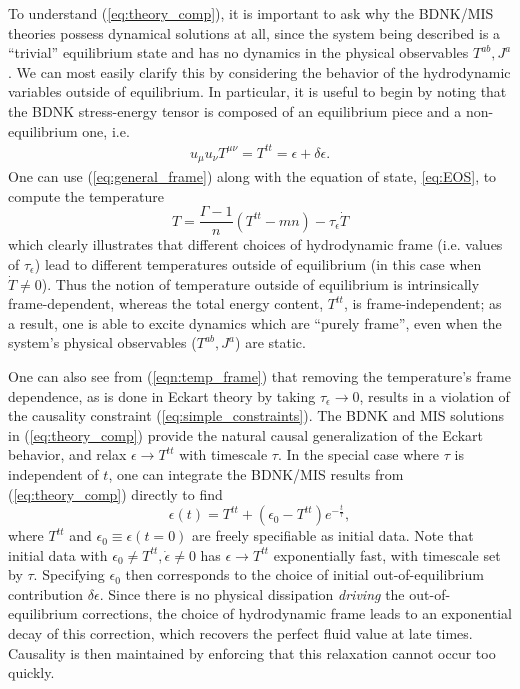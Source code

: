 \documentclass[%
notitlepage,
superscriptaddress,
nofootinbib,
amsmath,
amssymb,
aps,
twocolumn
]{revtex4-1}
\begin{document}
To understand (\ref{eq:theory_comp}), it is important to ask why the
BDNK/MIS theories possess dynamical solutions at all, since the system
being described is a ``trivial'' equilibrium state and has no dynamics in
the physical observables $T^{ab}, J^{a}$.  
We can most easily clarify this by considering 
the behavior of the hydrodynamic variables outside of equilibrium.  In particular, it is useful to begin by noting that the BDNK stress-energy tensor is composed of an equilibrium piece and a non-equilibrium one, i.e.
\begin{align}
u_\mu u_\nu T^{\mu\nu} = T^{tt} = \epsilon + \delta \epsilon.
\label{eq:general_frame}
\end{align}
One can use (\ref{eq:general_frame}) along with the equation of state, \eqref{eq:EOS}, to compute the temperature
\begin{equation} \label{eqn:temp_frame}
T = \frac{\Gamma - 1}{n} (T^{tt} - m n) - \tau_{\epsilon} \dot{T}
\end{equation}
which clearly illustrates that
different choices of hydrodynamic frame (i.e. values of $\tau_{\epsilon}$) lead to
different temperatures outside of equilibrium (in this case when $\dot{T} \neq 0$).
Thus the notion of temperature outside of equilibrium is intrinsically frame-dependent, 
whereas the total energy content, $T^{tt}$, is frame-independent;
as a result, one is able to excite dynamics which are ``purely frame'', even when
the system's physical observables ($T^{ab}, J^{a}$) are static.

One can also see from (\ref{eqn:temp_frame}) that removing the temperature's frame 
dependence, as is done in Eckart theory by taking $\tau_{\epsilon} \to 0$, results 
in a violation of the causality constraint (\ref{eq:simple_constraints}).
The BDNK and MIS
solutions in (\ref{eq:theory_comp}) provide the natural causal
generalization of the Eckart behavior, and relax $\epsilon \to T^{tt}$ with
timescale $\tau$.  In the special case where $\tau$ is independent of $t$,
one can integrate the BDNK/MIS results from (\ref{eq:theory_comp}) directly
to find
\begin{equation} \label{eq:exp_relax}
\epsilon(t) = T^{tt} + (\epsilon_{0} - T^{tt}) e^{-\frac{t}{\tau}},
\end{equation}
where $T^{tt}$ and $\epsilon_{0} \equiv \epsilon(t = 0)$ are freely
specifiable as initial data.  Note that initial data with $\epsilon_{0}
\neq T^{tt}, \dot{\epsilon} \neq 0$ has $\epsilon \to T^{tt}$ exponentially
fast, with timescale set by $\tau$. 
Specifying $\epsilon_0$
then corresponds to the choice of initial out-of-equilibrium contribution
$\delta \epsilon$. Since there is no physical dissipation
\textit{driving} the out-of-equilibrium corrections, the choice of
hydrodynamic frame leads to an exponential decay of this correction,
which recovers the perfect fluid value at late times. Causality is then
maintained by enforcing that this relaxation cannot occur too quickly.
\end{document}
